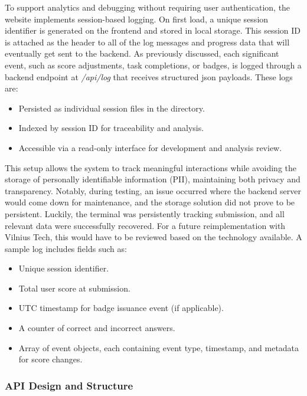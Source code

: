 To support analytics and debugging without requiring user authentication, the website implements session-based logging. 
On first load, a unique session identifier is generated on the frontend and stored in local storage. 
This session ID is attached as the header to all of the log messages and progress data that will eventually get sent to the backend.
As previously discussed, each significant event, such as score adjustments, task completions, or badges, is logged through a backend endpoint at \textit{/api/log} that receives structured \acrshort{json} payloads. These logs are:

\begin{itemize}
\item Persisted as individual session files in the directory.
\item Indexed by session ID for traceability and analysis.
\item Accessible via a read-only interface for development and analysis review.
\end{itemize}

This setup allows the system to track meaningful interactions while avoiding the storage of personally identifiable information (PII), maintaining both privacy and transparency. 
Notably, during testing, an issue occurred where the backend server would come down for maintenance, and the storage solution did not prove to be persistent. 
Luckily, the terminal was persistently tracking submission, and all relevant data were successfully recovered. 
For a future reimplementation with Vilnius Tech, this would have to be reviewed based on the technology available. 
A sample log includes fields such as:

\begin{itemize}
\item Unique session identifier.
\item Total user score at submission.
\item UTC timestamp for badge issuance event (if applicable).
\item A counter of correct and incorrect answers.
\item Array of event objects, each containing event type, timestamp, and metadata for score changes.
\end{itemize}

\subsubsection{API Design and Structure}


